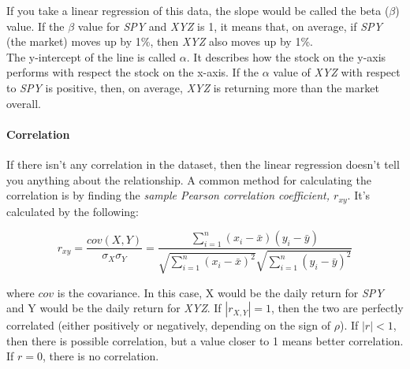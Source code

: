 \noindent If you take a linear regression of this data, the slope would be called the beta ($\beta$) value. If the $\beta$ value for \textit{SPY} and \textit{XYZ} is 1, it means that, on average, if \textit{SPY} (the market) moves up by 1\%, then \textit{XYZ} also moves up by 1\%.\\

\noindent The y-intercept of the line is called $\alpha$. It describes how the stock on the y-axis performs with respect the stock on the x-axis. If the $\alpha$ value of \textit{XYZ} with respect to \textit{SPY} is positive, then, on average, \textit{XYZ} is returning more than the market overall.

\paragraph{Correlation} If there isn't any correlation in the dataset, then the linear regression doesn't tell you anything about the relationship. A common method for calculating the correlation is by finding the \textit{sample Pearson correlation coefficient, $r_{xy}$}. It's calculated by the following:

\begin{equation*}
	r_{xy} = \frac{cov(X,Y)}{\sigma_{X}\sigma_{Y}} = \frac{\sum_{i=1}^{n}(x_i - \bar{x})(y_i - \bar{y})}{\sqrt{\sum_{i=1}^{n}(x_i - \bar{x})^2}\sqrt{\sum_{i=1}^{n}(y_i - \bar{y})^2}}
\end{equation*}

where $cov$ is the covariance. In this case, X would be the daily return for \textit{SPY} and Y would be the daily return for \textit{XYZ}.
\noindent If $|r_{X,Y}| = 1$, then the two are perfectly correlated (either positively or negatively, depending on the sign of $\rho$). If $|r| < 1$, then there is possible correlation, but a value closer to 1 means better correlation. If $r = 0$, there is no correlation. \\

